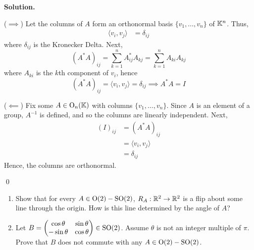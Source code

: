 \documentclass[12pt]{book}
\theoremstyle{definition}
\newenvironment{solution}
{%
  \par\noindent\textbf{Solution.}\quad
}
{%
  \qed\par
}
\begin{document}
\begin{solution}
  ($\implies$) Let the columns of $A$ form an orthonormal basis $\{ v_1, \dots, v_n \}$ of $\mathbb{K}^n$.
  Thus,
  \[
  \begin{aligned}
    \langle v_i, v_j \rangle &= \delta_{ij}
  \end{aligned}
  \]
  where $\delta_{ij}$ is the Kronecker Delta.
  Next,
  \[
    (A^*A)_{ij} = \sum_{k = 1}^n A^*_{ij}A_{kj} = \sum_{k = 1}^n A_{ki}A_{kj}
  \]
  where $A_{ki}$ is the $k$th component of $v_i$, hence
  \[
    (A^*A)_{ij} = \langle v_i, v_j \rangle = \delta_{ij} \implies A^*A = I
  \] 

  ($\impliedby$) Fix some $A \in \text{O}_n(\mathbb{K})$ with columns $\{ v_1, \dots, v_n \}$.
  Since $A$ is an element of a group, $A^{-1}$ is defined, and so the columns are linearly independent.
  Next, 
  \[
  \begin{aligned}
    (I)_{ij} &= (A^*A)_{ij} \\
             &= \langle v_i, v_j \rangle \\
             &= \delta_{ij}
  \end{aligned}
  \]     
  Hence, the columns are orthonormal.


\end{solution}

\begin{taggedexercise}[Complete]
  \begin{enumerate}
    \item Show that for every $A \in \mathrm{O}(2) - \mathrm{SO}(2)$, $R_A: \mathbb{R}^2 \to \mathbb{R}^2$ is a flip about some line through the origin. How is this line determined by the angle of $A$?
    \item Let $B = \begin{pmatrix} \cos \theta & \sin \theta \\ -\sin\theta & \cos\theta \end{pmatrix} \in \mathrm{SO}(2)$. Assume $\theta$ is not an integer multiple of $\pi$. Prove that $B$ does not commute with any $A \in \mathrm{O}(2) - \mathrm{SO}(2)$.
  \end{enumerate}
\end{taggedexercise}
\end{document}
